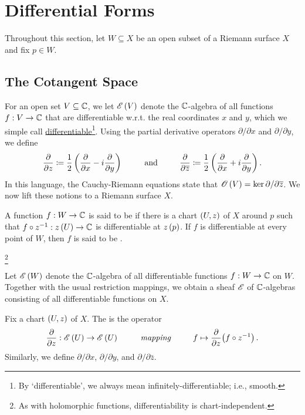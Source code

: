 \documentclass[../Moduli_Spaces_of_Riemann_Surfaces.tex]{subfiles}
\begin{document}
    \section{Differential Forms}\label{CC:sec:differential_forms}
    Throughout this section, let $W\subseteq X$ be an open subset of a Riemann surface $X$ and fix $p\in W$.
    \subsection{The Cotangent Space}
    For an open set $V\subseteq\mathbb{C}$, we let $\mathscr{E}\left(V\right)$ denote the $\mathbb{C}$-algebra of all functions $f:V\to\mathbb{C}$ that are differentiable w.r.t. the real coordinates $x$ and $y$, which we simple call \ul{differentiable}\footnote{By `differentiable', we always mean infinitely-differentiable; i.e., smooth.}. Using the partial derivative operators $\partial/\partial x$ and $\partial/\partial y$, we define
    \begin{equation*}
        \frac{\partial}{\partial z}\coloneqq\frac{1}{2}\l(\frac{\partial}{\partial x}-i\frac{\partial}{\partial y}\r)\ \ \ \ \ \ \ \ \textrm{and}\ \ \ \ \ \ \ \ \frac{\partial}{\partial\bar{z}}\coloneqq\frac{1}{2}\l(\frac{\partial}{\partial x}+i\frac{\partial}{\partial y}\r).
    \end{equation*}
    In this language, the Cauchy-Riemann equations state that $\mathscr{O}\left(V\right)=\ker\partial/\partial\overline{z}$. We now lift these notions to a Riemann surface $X$.
    \begin{definition}
        A function $f:W\to\mathbb{C}$ is said to be  if there is a chart $\left(U,z\right)$ of $X$ around $p$ such that $f\circ z^{-1}:z\left(U\right)\to\mathbb{C}$ is differentiable at $z\left(p\right)$. If $f$ is differentiable at every point of $W$, then $f$ is said to be .
    \end{definition}
    \footnote{As with holomorphic functions, differentiability is chart-independent.}
    \vspace{-0.05in}
    \begin{remark}
        Let $\mathscr{E}\left(W\right)$ denote the $\mathbb{C}$-algebra of all differentiable functions $f:W\to\mathbb{C}$ on $W$. Together with the usual restriction mappings, we obtain a sheaf $\mathscr{E}$ of $\mathbb{C}$-algebras consisting of all differentiable functions on $X$.\exqed
    \end{remark}
    \begin{definition}\label{CC:def:partial_derivative}
        Fix a chart $\left(U,z\right)$ of $X$. The  is the operator
        \begin{equation*}
            \frac{\partial}{\partial z}:\DIFF\l(U\r)\to\DIFF\l(U\r)\ \ \ \ \ \ \ \ \textrm{\it{mapping}}\ \ \ \ \ \ \ \ f\mapsto\frac{\partial}{\partial z}\!\l(f\circ z^{-1}\r).
        \end{equation*}
        Similarly, we define $\partial/\partial x$, $\partial/\partial y$, and $\partial/\partial\bar{z}$.
    \end{definition}
\end{document}

